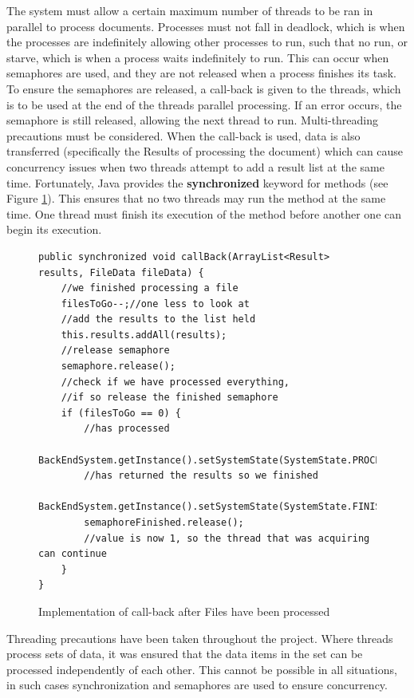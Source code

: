 \par The system must allow a certain maximum number of threads to be ran in parallel to process documents. Processes must not fall in deadlock, which is when the processes are indefinitely allowing other processes to run, such that no run, or starve, which is when a process waits indefinitely to run. This can occur when semaphores are used, and they are not released when a process finishes its task. To ensure the semaphores are released, a call-back is given to the threads, which is to be used at the end of the threads parallel processing. If an error occurs, the semaphore is still released, allowing the next thread to run. Multi-threading precautions must be considered. When the call-back is used, data is also transferred (specifically the Results of processing the document) which can cause concurrency issues when two threads attempt to add a result list at the same time. Fortunately, Java provides the \textbf{synchronized} keyword for methods (see Figure \ref{fig:callbackFilesImplemented}). This ensures that no two threads may run the method at the same time. One thread must finish its execution of the method before another one can begin its execution.

\begin{figure}[H]
\begin{lstlisting}
public synchronized void callBack(ArrayList<Result> results, FileData fileData) {
    //we finished processing a file
    filesToGo--;//one less to look at
    //add the results to the list held
    this.results.addAll(results);
    //release semaphore
    semaphore.release();
    //check if we have processed everything, 
    //if so release the finished semaphore
    if (filesToGo == 0) {
        //has processed
        BackEndSystem.getInstance().setSystemState(SystemState.PROCESSED);
        //has returned the results so we finished
        BackEndSystem.getInstance().setSystemState(SystemState.FINISHED);
        semaphoreFinished.release();
	    //value is now 1, so the thread that was acquiring can continue
    }
}
\end{lstlisting}
\caption{Implementation of call-back after Files have been processed}
\label{fig:callbackFilesImplemented}
\end{figure}

\par Threading precautions have been taken throughout the project. Where threads process sets of data, it was ensured that the data items in the set can be processed independently of each other. This cannot be possible in all situations, in such cases synchronization and semaphores are used to ensure concurrency.

